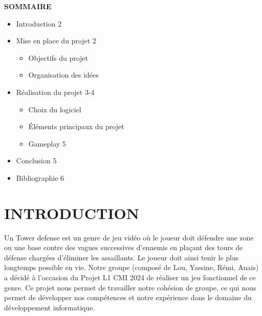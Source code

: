 \documentclass{article}
\begin{document}
\begin{center}
    \begin{minipage}{0.8\textwidth}
        \centering
        \hspace{0.8cm}
        {\LARGE\bfseries SOMMAIRE} \\[10pt]
        \begin{itemize}[label=-, itemsep=5pt]
            \item \large Introduction \hfill 2
            \item \large Mise en place du projet \hfill 2
            \begin{itemize}[label=--, font=\normalsize, itemsep=3pt]
                \item Objectifs du projet
                \item Organisation des idées
            \end{itemize}
            \item \large Réalisation du projet \hfill 3-4
            \begin{itemize}[label=--, font=\normalsize, itemsep=3pt]
                \item Choix du logiciel
                \item Éléments principaux du projet
            \item \large Gameplay \hfill 5
            \end{itemize}
            \item \large Conclusion \hfill 5
            \item \large Bibliographie \hfill 6
        \end{itemize}
    \end{minipage} 
\end{center}

\newpage

\setlength{\parindent}{1cm}

\section*{INTRODUCTION}
Un Tower defense est un genre de jeu vidéo où le joueur doit défendre une zone ou une base contre des vagues successives d'ennemis en plaçant des tours de défense chargées d’éliminer les assaillants. Le joueur doit ainsi tenir le plus longtemps possible en vie. Notre groupe (composé de Lou, Yassine, Rémi, Anais) a décidé à l’occasion du Projet L1 CMI 2024 de réaliser un jeu fonctionnel de ce genre. Ce projet nous permet de travailler notre cohésion de groupe, ce qui nous permet de développer nos compétences et notre expérience dans le domaine du développement informatique.
\end{document}
